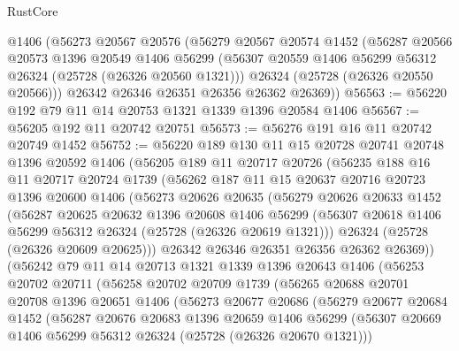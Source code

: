 \begin{lexlean}{RustCore}
\begin{coremodule}
    @1406
    (@56273
      @20567
      @20576
      (@56279
        @20567
        @20574
        @1452
        (@56287
          @20566
          @20573
          @1396
          @20549
          @1406
          @56299
          (@56307 @20559 @1406 @56299 @56312 @26324 (@25728 (@26326 @20560 @1321)))
          @26324
          (@25728 (@26326 @20550 @20566)))
        @26342
        @26346
        @26351
        @26356
        @26362
        @26369))
@56563 := @56220 @192 @79 @11 @14 @20753 @1321 @1339 @1396 @20584 @1406
@56567 := @56205 @192 @11 @20742 @20751
@56573 := @56276 @191 @16 @11 @20742 @20749 @1452
@56752 := @56220
    @189
    @130
    @11
    @15
    @20728
    @20741
    @20748
    @1396
    @20592
    @1406
    (@56205
      @189
      @11
      @20717
      @20726
      (@56235
        @188
        @16
        @11
        @20717
        @20724
        @1739
        (@56262
          @187
          @11
          @15
          @20637
          @20716
          @20723
          @1396
          @20600
          @1406
          (@56273
            @20626
            @20635
            (@56279
              @20626
              @20633
              @1452
              (@56287
                @20625
                @20632
                @1396
                @20608
                @1406
                @56299
                (@56307 @20618 @1406 @56299 @56312 @26324 (@25728 (@26326 @20619 @1321)))
                @26324
                (@25728 (@26326 @20609 @20625)))
              @26342
              @26346
              @26351
              @26356
              @26362
              @26369))
          (@56242
            @79
            @11
            @14
            @20713
            @1321
            @1339
            @1396
            @20643
            @1406
            (@56253
              @20702
              @20711
              (@56258
                @20702
                @20709
                @1739
                (@56265
                  @20688
                  @20701
                  @20708
                  @1396
                  @20651
                  @1406
                  (@56273
                    @20677
                    @20686
                    (@56279
                      @20677
                      @20684
                      @1452
                      (@56287
                        @20676
                        @20683
                        @1396
                        @20659
                        @1406
                        @56299
                        (@56307 @20669 @1406 @56299 @56312 @26324 (@25728 (@26326 @20670 @1321)))

\end{coremodule}
\end{lexlean}
